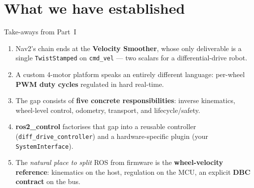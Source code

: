 \section{What we have established}

\begin{frame}{Take-aways from Part~I}
  \begin{enumerate}\setlength\itemsep{4pt}
    \item Nav2's chain ends at the \textbf{Velocity Smoother}, whose only
          deliverable is a single \texttt{TwistStamped} on \texttt{cmd\_vel}
          --- two scalars for a differential-drive robot.
    \item A custom 4-motor platform speaks an entirely different language:
          per-wheel \textbf{PWM duty cycles} regulated in hard real-time.
    \item The gap consists of \textbf{five concrete responsibilities}:
          inverse kinematics, wheel-level control, odometry, transport,
          and lifecycle/safety.
    \item \textbf{ros2\_control} factorises that gap into a reusable
          controller (\texttt{diff\_drive\_controller}) and a
          hardware-specific plugin (your \texttt{SystemInterface}).
    \item The \emph{natural place to split} ROS from firmware is the
          \textbf{wheel-velocity reference}: kinematics on the host,
          regulation on the MCU, an explicit \textbf{DBC contract} on the
          bus.
  \end{enumerate}
\end{frame}

